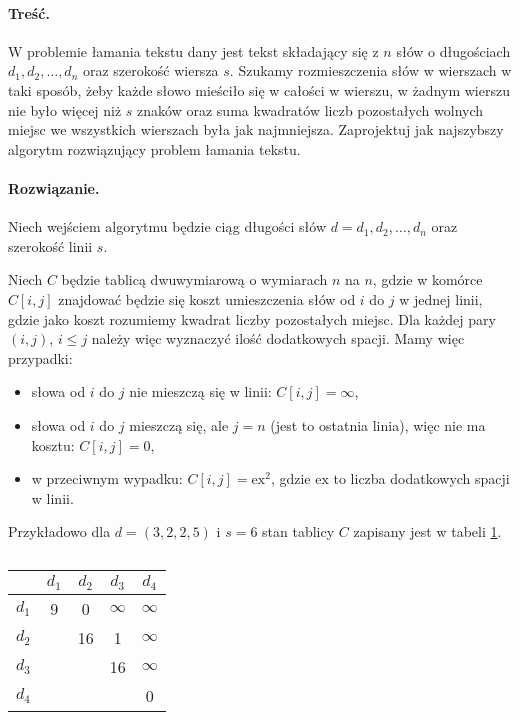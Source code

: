 \paragraph{Treść.} W problemie łamania tekstu dany jest tekst składający się z $n$
słów o długościach $d_1, d_2, \ldots , d_n$ oraz
szerokość wiersza $s$. Szukamy rozmieszczenia słów w wierszach w taki 
sposób, żeby każde słowo mieściło się w całości
w wierszu, w żadnym wierszu nie było więcej niż $s$ znaków 
oraz suma kwadratów liczb pozostałych wolnych miejsc we
wszystkich wierszach była jak najmniejsza.
Zaprojektuj jak najszybszy algorytm rozwiązujący problem łamania tekstu.
\paragraph{Rozwiązanie.} Niech wejściem algorytmu będzie ciąg  długości słów $d=d_1,d_2,\dotsc,d_n$ oraz szerokość linii $s$.

Niech $C$ będzie tablicą dwuwymiarową o wymiarach $n$ na $n$, gdzie w komórce $C[i,j]$ znajdować będzie się koszt umieszczenia słów od $i$ do $j$ w jednej linii, gdzie jako koszt rozumiemy kwadrat liczby pozostałych miejsc. Dla każdej pary $(i,j)$, $i\leq j$ należy więc wyznaczyć ilość dodatkowych spacji. Mamy więc przypadki: \begin{itemize}
	\item słowa od $i$ do $j$ nie mieszczą się w linii: $C[i,j]=\infty$,
	\item słowa od $i$ do $j$ mieszczą się, ale $j=n$ (jest to ostatnia linia), więc nie ma kosztu: $C[i,j]=0$,
	\item w przeciwnym wypadku: $C[i,j]=\textrm{ex}^2$, gdzie $\textrm{ex}$ to liczba dodatkowych spacji w linii.
\end{itemize}

Przykładowo dla $d=(3,2,2,5)$ i $s=6$ stan tablicy $C$ zapisany jest w tabeli \ref{tab_zad13_C}.
\begin{table}[H]
	\centering
	\def\arraystretch{1.25}
	\begin{tabular}{|c|cccc|}
		\hline \diagbox{$i$}{$j$}
		& \multicolumn{1}{c|}{$d_1$} & \multicolumn{1}{c|}{$d_2$} & \multicolumn{1}{c|}{$d_3$} & \multicolumn{1}{c|}{$d_4$} \\ \hline
		$d_1$ & 9 & 0  & $\infty$ & $\infty$ \\ \cline{1-1}
		$d_2$ &   & 16 &        1 & $\infty$ \\ \cline{1-1}
		$d_3$ &   &    &       16 & $\infty$ \\ \cline{1-1}
		$d_4$ &   &    &          &        0 \\ \cline{1-1}
		\hline
	\end{tabular}
	\caption{}
	\label{tab_zad13_C}
\end{table}

